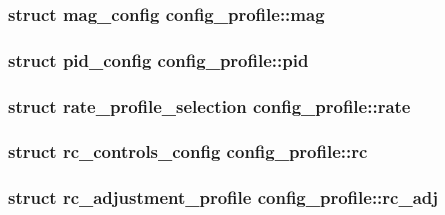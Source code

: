 \hypertarget{structconfig__profile_ade4b97078c9e4f0c546d407659fc881c}{
\subsubsection[{mag}]{\setlength{\rightskip}{0pt plus 5cm}struct {\bf mag\+\_\+config} config\+\_\+profile\+::mag}}\label{structconfig__profile_ade4b97078c9e4f0c546d407659fc881c}
\hypertarget{structconfig__profile_aed102519582975e36138dcd8b2b3be1a}{
\subsubsection[{pid}]{\setlength{\rightskip}{0pt plus 5cm}struct {\bf pid\+\_\+config} config\+\_\+profile\+::pid}}\label{structconfig__profile_aed102519582975e36138dcd8b2b3be1a}
\hypertarget{structconfig__profile_a3cd92c84b4f601536028dd41d1b8e5c5}{
\subsubsection[{rate}]{\setlength{\rightskip}{0pt plus 5cm}struct {\bf rate\+\_\+profile\+\_\+selection} config\+\_\+profile\+::rate}}\label{structconfig__profile_a3cd92c84b4f601536028dd41d1b8e5c5}
\hypertarget{structconfig__profile_a1c1b9ed298777bf616d1021a9b467ea4}{
\subsubsection[{rc}]{\setlength{\rightskip}{0pt plus 5cm}struct {\bf rc\+\_\+controls\+\_\+config} config\+\_\+profile\+::rc}}\label{structconfig__profile_a1c1b9ed298777bf616d1021a9b467ea4}
\hypertarget{structconfig__profile_aa67ec5ef75e8604f4bd63529ba8964e0}{
\subsubsection[{rc\+\_\+adj}]{\setlength{\rightskip}{0pt plus 5cm}struct {\bf rc\+\_\+adjustment\+\_\+profile} config\+\_\+profile\+::rc\+\_\+adj}}\label{structconfig__profile_aa67ec5ef75e8604f4bd63529ba8964e0}

